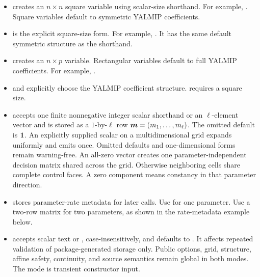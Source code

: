 \arghead
\begin{itemize}[leftmargin=*]
  \item {} creates an $n\times n$ square variable using scalar-size shorthand. For example, . Square variables default to symmetric YALMIP coefficients. \item {} is the explicit square-size form. For example, . It has the same default symmetric structure as the shorthand. \item {} creates an $n\times p$ variable. Rectangular variables default to full YALMIP coefficients. For example, . \item {} and  explicitly choose the YALMIP coefficient structure.  requires a square size. \item {} accepts one finite nonnegative integer scalar shorthand or an $\ell$-element vector and is stored as a $1$-by-$\ell$ row $\boldsymbol{m}=(m_1,\ldots,m_\ell)$. The omitted default is $\boldsymbol{1}$. An explicitly supplied scalar on a multidimensional grid expands uniformly and emits  once. Omitted defaults and one-dimensional forms remain warning-free. An all-zero vector creates one parameter-independent decision matrix shared across the grid. Otherwise neighboring cells share complete control faces. A zero component means constancy in that parameter direction. \item {} stores parameter-rate metadata for later  calls. Use  for one parameter. Use a two-row matrix for two parameters, as shown in the rate-metadata example below. \item {} accepts scalar text  or , case-insensitively, and defaults to . It affects repeated validation of package-generated storage only. Public options, grid, structure, affine safety, continuity, and source semantics remain global in both modes. The mode is transient constructor input.
\end{itemize}

